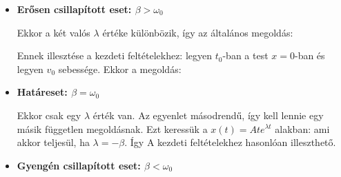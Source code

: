     \begin{itemize}
     \item {\bf Erősen csillapított eset: $\beta>\omega_0$}
     
     Ekkor a két valós $\lambda$ értéke különbözik, így az általános megoldás:
     
     Ennek illesztése a kezdeti feltételekhez: legyen $t_0$-ban a test $x=0$-ban és legyen $v_0$ sebessége.
   Ekkor a megoldás:
     \item {\bf Határeset: $\beta=\omega_0$}
      
      Ekkor csak egy $\lambda$ érték van.
   Az egyenlet másodrendű, így kell lennie egy másik független megoldásnak.
   Ezt keressük a $x(t)=Ate^{\lambda t}$ alakban:
      ami akkor teljesül, ha $\lambda=-\beta$. Így
      A kezdeti feltételekhez hasonlóan illeszthető.
      
     \item {\bf Gyengén csillapított eset: $\beta<\omega_0$}
      

\end{itemize}
